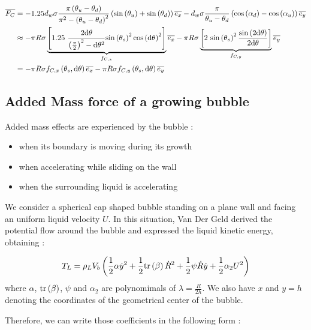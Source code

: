 \begin{align}
\vect{F_{C}}&=-1.25 d_{w}\sigma \frac{\pi\parth{\theta_{u}-\theta_{d}}}{\pi^{2}-\parth{\theta_{u}-\theta_{d}}^{2}}\parth{\sin{\theta_{u}}+\sin{\theta_{d}} }\vect{e_{x}} -d_{w} \sigma \frac{\pi}{\theta_{u}-\theta_{d}}\parth{\cos{\alpha_{d}}- \cos{\alpha_{u}}}\vect{e_{y}} \\
%
&\approx -\pi R \sigma \underbrace{\crocht{1.25\ \frac{2\dtheta}{\parth{\frac{\pi}{2}}^{2}-\dtheta^{2}}\sin{\theta_{s}}^{2}\cos{\dtheta}^{2}}}_{f_{C,x}} \vect{e_{x}} - \pi R \sigma \underbrace{\crocht{2\ \sin{\theta_{s}}^{2}\frac{\sin{2\dtheta}}{2\dtheta}}}_{f_{C,y}}\vect{e_{y}}\\
%
&= -\pi R \sigma f_{C,x}\parth{\theta_{s}, \dtheta}\vect{e_{x}} - \pi R \sigma f_{C,y}\parth{\theta_{s}, \dtheta} \vect{e_{y}}
\end{align}

\npar

\subsection{Added Mass force of a growing bubble}

Added mass effects are experienced by the bubble :

\begin{itemize}
\item when its boundary is moving during its growth
\item when accelerating while sliding on the wall 
\item when the surrounding liquid is accelerating
\end{itemize}

We consider a spherical cap shaped bubble standing on a plane wall and facing an uniform liquid velocity $U$. In this situation, Van Der Geld derived the potential flow around the bubble and expressed the liquid kinetic energy, obtaining : 

\begin{align}
T_{L}=\rho_{L}V_{b}\left(  \frac{1}{2}\alpha \dot{y}^{2} + \frac{1}{2} \mathrm{tr}\left( \beta \right)\dot{R}^{2}+\frac{1}{2}\psi \dot{R}\dot{y} + \frac{1}{2} \alpha_{2} U^{2}  \right)
\end{align}
where $\alpha$, $\mathrm{tr}\left( \beta \right)$, $\psi$ and $\alpha_{2}$ are polynomimals of $\lambda = \frac{R}{2h}$. We also have $x$ and $y=h$ denoting the coordinates of the geometrical center of the bubble.

Therefore, we can write those coefficients in the following form : 

